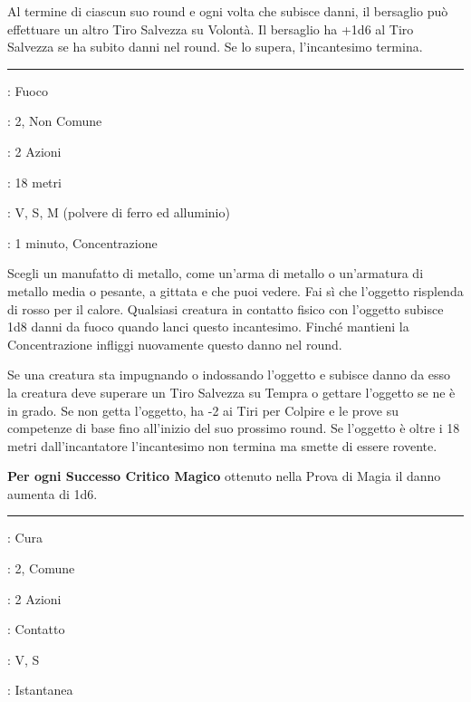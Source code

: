 \begin{multicols}{2}
Al termine di ciascun suo round e ogni volta che subisce danni, il bersaglio può effettuare un altro Tiro Salvezza su Volontà. Il bersaglio ha +1d6 al Tiro Salvezza se ha subito danni nel round. Se lo supera, l'incantesimo termina.

\smallskip\noindent\rule{\linewidth}{2pt} \hypertarget{Riscaldare il Metallo}{}\medskip{}
\noindent
\begin{description}[noitemsep, topsep=0pt, parsep=0pt, partopsep=0pt, leftmargin=0cm, labelwidth=2.8cm]
	\item[\textbf{Lista di Magia}]: Fuoco
	\item[\textbf{Livello}]: 2, Non Comune
	\item[\textbf{T. di Lancio}]: 2 Azioni
	\item[\textbf{Gittata}]: 18 metri
	\item[\textbf{Componenti}]: V, S, M (polvere di ferro ed alluminio)
	\item[\textbf{Durata}]: 1 minuto, Concentrazione
\end{description}

Scegli un manufatto di metallo, come un'arma di metallo o un'armatura di metallo media o pesante, a gittata e che puoi vedere. Fai sì che l'oggetto risplenda di rosso per il calore. Qualsiasi creatura in contatto fisico con l'oggetto subisce 1d8 danni da fuoco quando lanci questo incantesimo. Finché mantieni la Concentrazione infliggi nuovamente questo danno nel round.

Se una creatura sta impugnando o indossando l'oggetto e subisce danno da esso la creatura deve superare un Tiro Salvezza su Tempra o gettare l'oggetto se ne è in grado. Se non getta l'oggetto, ha -2 ai Tiri per Colpire e le prove su competenze di base fino all'inizio del suo prossimo round. Se l'oggetto è oltre i 18 metri dall'incantatore l'incantesimo non termina ma smette di essere rovente.

\textbf{Per ogni Successo Critico Magico} ottenuto nella Prova di Magia il danno aumenta di 1d6.

\smallskip\noindent\rule{\linewidth}{2pt} \hypertarget{Ristorare Inferiore}{}\medskip{}
\noindent
\begin{description}[noitemsep, topsep=0pt, parsep=0pt, partopsep=0pt, leftmargin=0cm, labelwidth=2.8cm]
	\item[\textbf{Lista di Magia}]: Cura
	\item[\textbf{Livello}]: 2, Comune
	\item[\textbf{T. di Lancio}]: 2 Azioni
	\item[\textbf{Gittata}]: Contatto
	\item[\textbf{Componenti}]: V, S
	\item[\textbf{Durata}]: Istantanea
\end{description}


\end{multicols}

